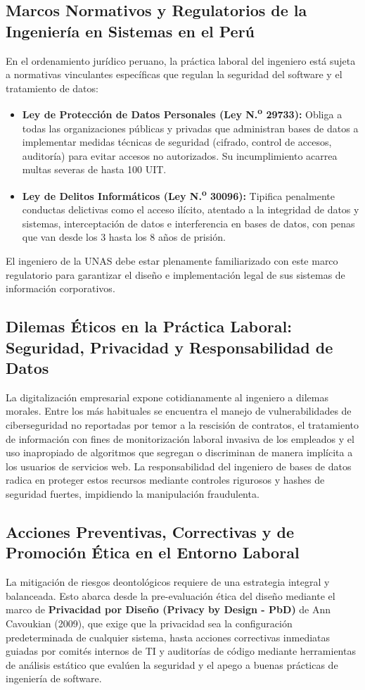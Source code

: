\documentclass[12pt,a4paper]{article}
\begin{document}
\subsection{Marcos Normativos y Regulatorios de la Ingeniería en Sistemas en el Perú}
En el ordenamiento jurídico peruano, la práctica laboral del ingeniero está sujeta a normativas vinculantes específicas que regulan la seguridad del software y el tratamiento de datos:
\begin{itemize}
    \item \textbf{Ley de Protección de Datos Personales (Ley N.{\textsuperscript{o}} 29733):} Obliga a todas las organizaciones públicas y privadas que administran bases de datos a implementar medidas técnicas de seguridad (cifrado, control de accesos, auditoría) para evitar accesos no autorizados. Su incumplimiento acarrea multas severas de hasta 100 UIT.
    \item \textbf{Ley de Delitos Informáticos (Ley N.{\textsuperscript{o}} 30096):} Tipifica penalmente conductas delictivas como el acceso ilícito, atentado a la integridad de datos y sistemas, interceptación de datos e interferencia en bases de datos, con penas que van desde los 3 hasta los 8 años de prisión.
\end{itemize}
El ingeniero de la UNAS debe estar plenamente familiarizado con este marco regulatorio para garantizar el diseño e implementación legal de sus sistemas de información corporativos.

\subsection{Dilemas Éticos en la Práctica Laboral: Seguridad, Privacidad y Responsabilidad de Datos}
La digitalización empresarial expone cotidianamente al ingeniero a dilemas morales. Entre los más habituales se encuentra el manejo de vulnerabilidades de ciberseguridad no reportadas por temor a la rescisión de contratos, el tratamiento de información con fines de monitorización laboral invasiva de los empleados y el uso inapropiado de algoritmos que segregan o discriminan de manera implícita a los usuarios de servicios web. La responsabilidad del ingeniero de bases de datos radica en proteger estos recursos mediante controles rigurosos y hashes de seguridad fuertes, impidiendo la manipulación fraudulenta.

\subsection{Acciones Preventivas, Correctivas y de Promoción Ética en el Entorno Laboral}
La mitigación de riesgos deontológicos requiere de una estrategia integral y balanceada. Esto abarca desde la pre-evaluación ética del diseño mediante el marco de \textbf{Privacidad por Diseño (Privacy by Design - PbD)} de Ann Cavoukian (2009), que exige que la privacidad sea la configuración predeterminada de cualquier sistema, hasta acciones correctivas inmediatas guiadas por comités internos de TI y auditorías de código mediante herramientas de análisis estático que evalúen la seguridad y el apego a buenas prácticas de ingeniería de software.
\end{document}
